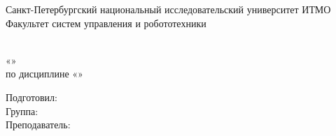 \begin{titlepage}
\begin{center}
    Санкт-Петербургский национальный исследовательский университет ИТМО\\
        Факультет систем управления и робототехники
        \vskip 7cm
        
        \Huge \workType   \\
        \Large {«\workName »}  \\
        \Large {по дисциплине «\subjectName»} \\
        \vskip 5cm
    \end{center}


    \begin{flushright}
        Подготовил:  \authorName      \\
        Группа: \groupNumber           \\
        Преподаватель:   \teacherName \\
    \end{flushright}
    \vskip 5cm


\begin{center}
    \placeNyear
\end{center}
\end{titlepage}